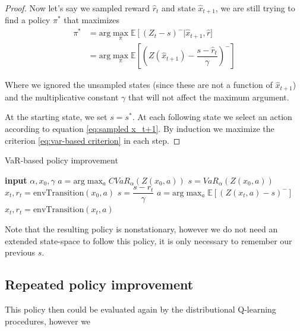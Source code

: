 \begin{proof}
Now let's say we sampled reward $\hat{r}_t$ and state $\hat{x}_{t+1}$, we are still trying to find a policy $\pi^*$ that maximizes 
\begin{equation}\label{eq:sampled x_t+1}
\begin{split}
\pi^* &=\text{arg}\max_\pi \mathbb{E}\left[(Z_t-s)^-\right | \hat{x}_{t+1}, \hat{r}]\\
&= \text{arg}\max_\pi \mathbb{E}\left[\left(Z(\hat{x}_{t+1}) - \dfrac{s - \hat{r}_t}{\gamma}\right)^-\right]
\end{split}
\end{equation}

Where we ignored the unsampled states (since these are not a function of $\hat{x}_{t+1}$) and the multiplicative constant $\gamma$ that will not affect the maximum argument.

At the starting state, we set $s=s^*$. At each following state we select an action according to equation \ref{eq:sampled x_t+1}. By induction we maximize the criterion \ref{eq:var-based criterion} in each step.
\end{proof}

\begin{algorithm}
\caption{VaR-based policy improvement}
\label{alg:var}
\begin{algorithmic}
    \STATE \textbf{input} $\alpha, x_0, \gamma$
    \STATE $a = \text{arg}\max_a CVaR_\alpha(Z(x_0, a))$
    \STATE $s = VaR_\alpha(Z(x_0, a))$
    \STATE $x_t, r_t = \text{envTransition}(x_0, a)$
    	\STATE $s = \dfrac{s-r_t}{\gamma}$
    	\STATE $a = \text{arg}\max_a \mathbb{E}\left[(Z(x_t, a)-s)^- \right]$
    	\STATE $x_t, r_t = \text{envTransition}(x_t, a)$
   	\ENDWHILE
\end{algorithmic}
\end{algorithm}

Note that the resulting policy is nonstationary, however we do not need an extended state-space to follow this policy, it is only necessary to remember our previous $s$.

\subsection{Repeated policy improvement}
This policy then could be evaluated again by the distributional Q-learning procedures, however we 




